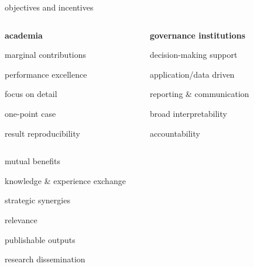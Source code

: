 \documentclass[aspectratio=1610,notes,blackandwhite,mathsans,usenames,dvipsnames]{beamer}
\begin{document}
	
	
	\begin{frame}{\huge objectives and incentives}
		\Large		
		
		\begin{columns}
        		\begin{column}{0.5\textwidth}
				\textbf{\Large academia}\\[1ex]
				\large
				\begin{itemize}[label=$\blacktriangleright$]
				{\color{lig}
					\item marginal contributions\\[1ex]
					\item performance excellence\\[1ex]
					\item focus on detail\\[1ex]
					\item one-point case\\[1ex]
					\item result reproducibility
				}	
				\end{itemize}
			\end{column}
			\begin{column}{0.5\textwidth}
				\textbf{\Large governance institutions}\\[1ex]
				\large
				\begin{itemize}[label=$\blacktriangleright$]
				{\color{lig}
					\item decision-making support\\[1ex]
					\item application/data driven\\ [1ex]
					\item reporting \& communication\\[1ex]
					\item broad interpretability\\[1ex]
					\item accountability
				}	
				\end{itemize}
			\end{column}
		\end{columns}
	\end{frame}
	
	
	
	
	\begin{frame}{\huge mutual benefits}
		\Large		
		\begin{itemize}[label=$\blacktriangleright$]
		{\color{lig}
			\item knowledge \& experience exchange\\[1ex]
			\item strategic synergies \\[1ex]
			\item relevance\\[1ex]
			\item publishable outputs\\[1ex]
			\item research dissemination
		}	
		\end{itemize}
	\end{frame}
\end{document}
